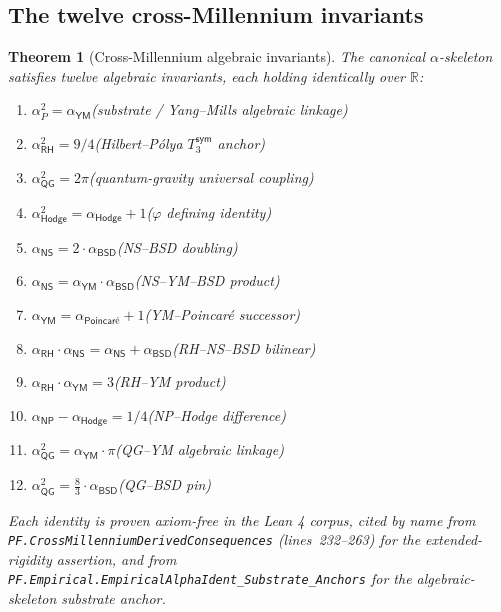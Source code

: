 \documentclass[11pt,a4paper]{amsart}
\theoremstyle{plain}
\newtheorem{theorem}{Theorem}[section]
\theoremstyle{definition}
\begin{document}
\subsection{The twelve cross-Millennium invariants}

\begin{theorem}[Cross-Millennium algebraic invariants]\label{thm:invariants}
The canonical $\alpha$-skeleton satisfies twelve algebraic invariants, each holding identically over $\mathbb{R}$:
\begin{enumerate}[label=(I\arabic*),itemsep=2pt]
\item $\alpha_{P}^2 = \alpha_{\textsf{YM}}$\hfill (substrate / Yang--Mills algebraic linkage)
\item $\alpha_{\textsf{RH}}^2 = 9/4$\hfill (Hilbert--P\'olya $T_3^{\textsf{sym}}$ anchor)
\item $\alpha_{\textsf{QG}}^2 = 2\pi$\hfill (quantum-gravity universal coupling)
\item $\alpha_{\textsf{Hodge}}^2 = \alpha_{\textsf{Hodge}} + 1$\hfill ($\varphi$ defining identity)
\item $\alpha_{\textsf{NS}} = 2\cdot\alpha_{\textsf{BSD}}$\hfill (NS--BSD doubling)
\item $\alpha_{\textsf{NS}} = \alpha_{\textsf{YM}}\cdot\alpha_{\textsf{BSD}}$\hfill (NS--YM--BSD product)
\item $\alpha_{\textsf{YM}} = \alpha_{\textsf{Poincar\'e}} + 1$\hfill (YM--Poincar\'e successor)
\item $\alpha_{\textsf{RH}}\cdot\alpha_{\textsf{NS}} = \alpha_{\textsf{NS}} + \alpha_{\textsf{BSD}}$\hfill (RH--NS--BSD bilinear)
\item $\alpha_{\textsf{RH}}\cdot\alpha_{\textsf{YM}} = 3$\hfill (RH--YM product)
\item $\alpha_{\textsf{NP}} - \alpha_{\textsf{Hodge}} = 1/4$\hfill (NP--Hodge difference)
\item $\alpha_{\textsf{QG}}^2 = \alpha_{\textsf{YM}}\cdot\pi$\hfill (QG--YM algebraic linkage)
\item $\alpha_{\textsf{QG}}^2 = \tfrac{8}{3}\cdot\alpha_{\textsf{BSD}}$\hfill (QG--BSD pin)
\end{enumerate}
Each identity is proven axiom-free in the Lean 4 corpus, cited by name from\\ \texttt{PF.CrossMillenniumDerivedConsequences} (lines~232--263) for the extended-rigidity assertion, and from \texttt{PF.Empirical.EmpiricalAlphaIdent\_Substrate\_Anchors} for the algebraic-skeleton substrate anchor.
\end{theorem}
\end{document}
